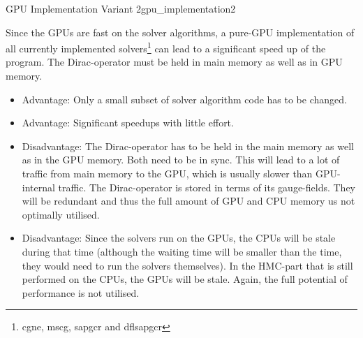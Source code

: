 \documentclass{article}
\theoremstyle{plain} %
\theoremstyle{convention} %
\theoremstyle{remark} %
\numberwithin{equation}{section}
\begin{document}
\begin{proposal}{GPU Implementation Variant 2}{gpu_implementation2} %

Since the GPUs are fast on the solver algorithms, a pure-GPU implementation of all currently implemented solvers\footnote{\acrshort{cgne}, \acrshort{mscg}, \acrshort{sapgcr} and \acrshort{dflsapgcr}} can lead to a significant speed up of the program. The Dirac-operator must be held in main memory as well as in GPU memory.

\begin{itemize}
    \item Advantage: Only a small subset of solver algorithm code has to be changed.
    \item Advantage: Significant speedups with little effort.
    \item Disadvantage: The Dirac-operator has to be held in the main memory as well as in the GPU memory. Both need to be in sync. This will lead to a lot of traffic from main memory to the GPU, which is usually slower than GPU-internal traffic. The Dirac-operator is stored in terms of its gauge-fields. They will be redundant and thus the full amount of GPU and CPU memory us not optimally utilised.
    \item Disadvantage: Since the solvers run on the GPUs, the CPUs will be stale during that time (although the waiting time will be smaller than the time, they would need to run the solvers themselves). In the HMC-part that is still performed on the CPUs, the GPUs will be stale. Again, the full potential of performance is not utilised.
\end{itemize}

\end{proposal}
\end{document}
